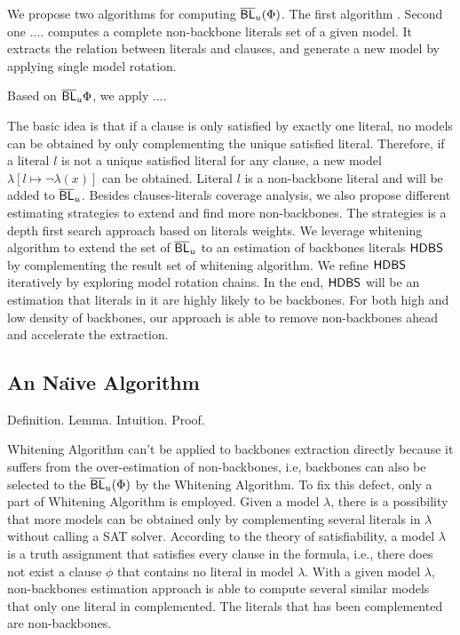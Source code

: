 We propose two algorithms for computing $\overline{\textsf{BL}}_u(\Phi)$. The first algorithm \MBNB.
Second one \HBNB....
\MBNB computes a complete non-backbone literals set of a given model.
It extracts the relation between literals and clauses, and generate a new model by applying single model rotation.


\medskip
Based on $\overline{\textsf{BL}}_u{\Phi}$, we apply ....

The basic idea is that if a clause is only satisfied by exactly one literal, no models can be obtained by only complementing the unique satisfied literal. Therefore, if a literal $l$ is not a unique satisfied literal for any clause, a new model $\lambda[l\mapsto\neg\lambda(x)]$ can be obtained. Literal $l$ is a non-backbone literal and will be added to $\overline{\textsf{BL}}_u$.  Besides clauses-literals coverage analysis, we also propose different estimating strategies to extend and find more non-backbones. The strategies is a depth first search approach based on literals weights.
We leverage whitening algorithm\cite{Par03,LMZ09} to extend the set of $\overline{\textsf{BL}}_u$ to an estimation of backbones literals $\textsf{HDBS}$ by complementing the result set of whitening algorithm. We refine $\textsf{HDBS}$ iteratively by exploring model rotation chains. In the end, $\textsf{HDBS}$ will be an estimation that literals in it are highly likely to be backbones.
For both high and low density of backbones, our approach is able to remove non-backbones ahead and accelerate the extraction.



\subsection{An Na\"{\i}ve Algorithm}
Definition.  Lemma.  Intuition. Proof.


Whitening Algorithm can't be applied to backbones extraction directly because it suffers from the over-estimation of non-backbones, i.e, backbones can also be selected to the $\overline{\textsf{BL}}_u(\Phi)$ by the Whitening Algorithm. To fix this defect, only a part of Whitening Algorithm is employed.
Given a model $\lambda$, there is a possibility that more models can be obtained only by complementing several literals in $\lambda$ without calling a SAT solver. According to the theory of satisfiability, a model $\lambda$ is a truth assignment that satisfies every clause in the formula, i.e., there does not exist a clause $\phi$ that contains no literal in model $\lambda$. With a given model $\lambda$, non-backbones estimation approach is able to compute several similar models that only one literal in complemented. The literals that has been complemented are non-backbones.

